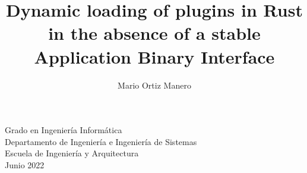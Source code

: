 \documentclass[a4paper,12pt,twoside,hidelinks,openright]{book}
\begin{document}
\begin{titlepage}
\begin{center}
\end{center}

\setcounter{footnote}{1}

\vspace*{2cm}
\fontsize{14pt}{14pt}\selectfont
\begin{center}
Grado en Ingeniería Informática\\ \medskip
Departamento de Ingeniería e Ingeniería de Sistemas\\
Escuela de Ingeniería y Arquitectura\\ \bigskip
Junio 2022\\
\end{center}


\renewcommand{\thefootnote}{\arabic{footnote}}
\end{titlepage}
\newpage


\title{Dynamic loading of plugins in Rust in the absence of a stable Application Binary Interface}
\author{Mario Ortiz Manero}

\pagebreak
\cleardoublepage%
\baselineskip 19pt

\renewcommand{\labelitemi}{$-$}
\renewcommand{\tablename}{Tabla}

\renewcommand{\appendixname}{Anexos}
\renewcommand{\appendixtocname}{Anexos}
\renewcommand{\appendixpagename}{Anexos}



\begingroup
\setlength{\parskip}{\baselineskip}%
\setlength{\parindent}{0pt}%

\newpage
\cleardoublepage%


\newpage
\cleardoublepage%


\newpage
\cleardoublepage%

\endgroup

\newpage
\cleardoublepage%
\renewcommand{\contentsname}{Índice}
\tableofcontents

\newpage
\renewcommand\listfigurename{Lista de Figuras}
\listoffigures

\newpage
\renewcommand\listtablename{Lista de Tablas}
\listoftables


\begingroup
\setlength{\parskip}{\baselineskip}%
\setlength{\parindent}{0pt}%








\endgroup
\end{document}
